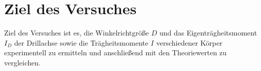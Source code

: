 \section{Ziel des Versuches}
\label{Versuchsziel}
Ziel des Versuches ist es, die Winkelrichtgröße $D$ und das Eigenträgheitsmoment $I_D$ der Drillachse sowie die Trägheitsmomente $I$ verschiedener Körper experimentell zu ermitteln und anschließend mit den
Theoriewerten zu vergleichen.